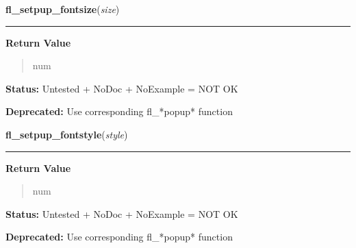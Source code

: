     \label{xformslib:library:fl_setpup_default_fontsize}

    \vspace{0.5ex}

\hspace{.8\funcindent}\begin{boxedminipage}{\funcwidth}

    \raggedright \textbf{fl\_setpup\_fontsize}(\textit{size})

    \vspace{-1.5ex}

    \rule{\textwidth}{0.5\fboxrule}
\setlength{\parskip}{2ex}
\setlength{\parskip}{1ex}
      \textbf{Return Value}
    \vspace{-1ex}

      \begin{quote}
      num

      \end{quote}

\textbf{Status:} Untested + NoDoc + NoExample = NOT OK



\textbf{Deprecated:} Use corresponding fl\_*popup* function



    \end{boxedminipage}

    \label{xformslib:library:fl_setpup_default_fontstyle}

    \vspace{0.5ex}

\hspace{.8\funcindent}\begin{boxedminipage}{\funcwidth}

    \raggedright \textbf{fl\_setpup\_fontstyle}(\textit{style})

    \vspace{-1.5ex}

    \rule{\textwidth}{0.5\fboxrule}
\setlength{\parskip}{2ex}
\setlength{\parskip}{1ex}
      \textbf{Return Value}
    \vspace{-1ex}

      \begin{quote}
      num

      \end{quote}

\textbf{Status:} Untested + NoDoc + NoExample = NOT OK



\textbf{Deprecated:} Use corresponding fl\_*popup* function



    \end{boxedminipage}

